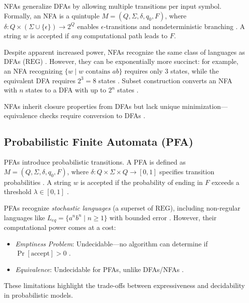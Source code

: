 NFAs generalize DFAs by allowing multiple transitions per input symbol. Formally, an NFA is a quintuple $M = (Q, \Sigma, \delta, q_0, F)$, where $\delta: Q \times (\Sigma \cup \{\epsilon\}) \to 2^Q$ enables $\epsilon$-transitions and nondeterministic branching \cite{hopcroft2006introduction}. A string $w$ is accepted if \textit{any} computational path leads to $F$. 

Despite apparent increased power, NFAs recognize the same class of languages as DFAs ($\text{REG}$) \cite{hopcroft2006introduction}. However, they can be exponentially more succinct: for example, an NFA recognizing $\{w \mid w \text{ contains } ab\}$ requires only $3$ states, while the equivalent DFA requires $2^3 = 8$ states \cite{hopcroft2006introduction}. Subset construction converts an NFA with $n$ states to a DFA with up to $2^n$ states \cite{hopcroft2006introduction}. 

NFAs inherit closure properties from DFAs but lack unique minimization—equivalence checks require conversion to DFAs \cite{hopcroft2006introduction}. 

\subsection{Probabilistic Finite Automata (PFA)}
\label{subsec:pfa} 

PFAs introduce probabilistic transitions. A PFA is defined as $M = (Q, \Sigma, \delta, q_0, F)$, where $\delta: Q \times \Sigma \times Q \to [0, 1]$ specifies transition probabilities \cite{rabin1963probabilistic}. A string $w$ is accepted if the probability of ending in $F$ exceeds a threshold $\lambda \in [0, 1]$ \cite{rabin1963probabilistic}. 

PFAs recognize \textit{stochastic languages} (a superset of $\text{REG}$), including non-regular languages like $L_{eq} = \{a^n b^n \mid n \geq 1\}$ with bounded error \cite{rabin1963probabilistic}. However, their computational power comes at a cost:
\begin{itemize}
    \item \textit{Emptiness Problem}: Undecidable—no algorithm can determine if $\Pr[\text{accept}] > 0$ \cite{paz1971introduction}.
    \item \textit{Equivalence}: Undecidable for PFAs, unlike DFAs/NFAs \cite{paz1971introduction}.
\end{itemize} 

These limitations highlight the trade-offs between expressiveness and decidability in probabilistic models. 

